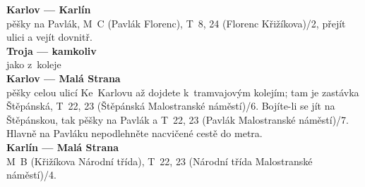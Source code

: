 \bigskip
\textbf {Karlov --- Karlín}\\
 pěšky na Pavlák, M~C (Pavlák \ra
Florenc), T~8, 24 (Florenc \ra Křižíkova)/2, přejít ulici a vejít
dovnitř.\\
\textbf{Troja --- kamkoliv}\\
 jako z~koleje\\
\textbf{Karlov --- Malá Strana}\\
 pěšky celou ulicí Ke~Karlovu až
dojdete k~tramvajovým kolejím; tam je zastávka Štěpánská, T~22, 23
(Štěpánská \ra Malostranské náměstí)/6. Bojíte-li se jít na
Štěpánskou, tak pěšky na Pavlák a T~22, 23 (Pavlák \ra
Malostranské náměstí)/7. Hlavně na Pavláku nepodlehněte nacvičené
cestě do metra.\\
\textbf{Karlín --- Malá Strana}\\
 M~B (Křižíkova \ra Národní třída),
T~22, 23 (Národní třída \ra Malostranské náměstí)/4.